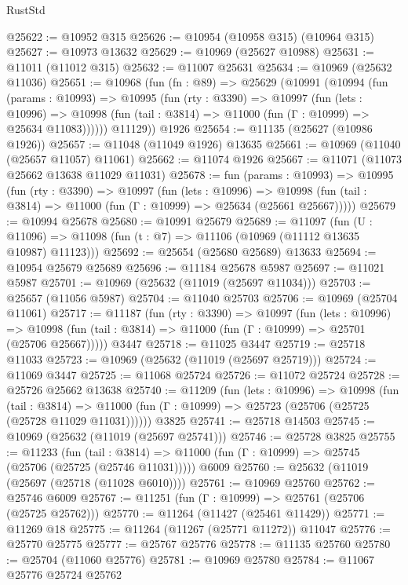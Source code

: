 \begin{lexlean}{RustStd}
\begin{coremodule}
@25622 := @10952 @315
@25626 := @10954 (@10958 @315) (@10964 @315)
@25627 := @10973 @13632
@25629 := @10969 (@25627 @10988)
@25631 := @11011 (@11012 @315)
@25632 := @11007 @25631
@25634 := @10969 (@25632 @11036)
@25651 := @10968
    (fun (fn : @89) =>
    @25629
      (@10991
        (@10994
          (fun (params : @10993) =>
          @10995
            (fun (rty : @3390) =>
            @10997
              (fun (lets : @10996) =>
              @10998 (fun (tail : @3814) => @11000 (fun (Γ : @10999) => @25634 @11083))))))
        @11129))
    @1926
@25654 := @11135 (@25627 (@10986 @1926))
@25657 := @11048 (@11049 @1926) @13635
@25661 := @10969 (@11040 (@25657 @11057) @11061)
@25662 := @11074 @1926
@25667 := @11071 (@11073 @25662 @13638 @11029 @11031)
@25678 := fun (params : @10993) =>
  @10995
    (fun (rty : @3390) =>
    @10997
      (fun (lets : @10996) =>
      @10998 (fun (tail : @3814) => @11000 (fun (Γ : @10999) => @25634 (@25661 @25667)))))
@25679 := @10994 @25678
@25680 := @10991 @25679
@25689 := @11097
    (fun (U : @11096) => @11098 (fun (t : @7) => @11106 (@10969 (@11112 @13635 @10987) @11123)))
@25692 := @25654 (@25680 @25689) @13633
@25694 := @10954 @25679 @25689
@25696 := @11184 @25678 @5987
@25697 := @11021 @5987
@25701 := @10969 (@25632 (@11019 (@25697 @11034)))
@25703 := @25657 (@11056 @5987)
@25704 := @11040 @25703
@25706 := @10969 (@25704 @11061)
@25717 := @11187
    (fun (rty : @3390) =>
    @10997
      (fun (lets : @10996) =>
      @10998 (fun (tail : @3814) => @11000 (fun (Γ : @10999) => @25701 (@25706 @25667)))))
    @3447
@25718 := @11025 @3447
@25719 := @25718 @11033
@25723 := @10969 (@25632 (@11019 (@25697 @25719)))
@25724 := @11069 @3447
@25725 := @11068 @25724
@25726 := @11072 @25724
@25728 := @25726 @25662 @13638
@25740 := @11209
    (fun (lets : @10996) =>
    @10998
      (fun (tail : @3814) =>
      @11000 (fun (Γ : @10999) => @25723 (@25706 (@25725 (@25728 @11029 @11031))))))
    @3825
@25741 := @25718 @14503
@25745 := @10969 (@25632 (@11019 (@25697 @25741)))
@25746 := @25728 @3825
@25755 := @11233
    (fun (tail : @3814) => @11000 (fun (Γ : @10999) => @25745 (@25706 (@25725 (@25746 @11031)))))
    @6009
@25760 := @25632 (@11019 (@25697 (@25718 (@11028 @6010))))
@25761 := @10969 @25760
@25762 := @25746 @6009
@25767 := @11251 (fun (Γ : @10999) => @25761 (@25706 (@25725 @25762)))
@25770 := @11264 (@11427 (@25461 @11429))
@25771 := @11269 @18
@25775 := @11264 (@11267 (@25771 @11272)) @11047
@25776 := @25770 @25775
@25777 := @25767 @25776
@25778 := @11135 @25760
@25780 := @25704 (@11060 @25776)
@25781 := @10969 @25780
@25784 := @11067 @25776 @25724 @25762

\end{coremodule}
\end{lexlean}
